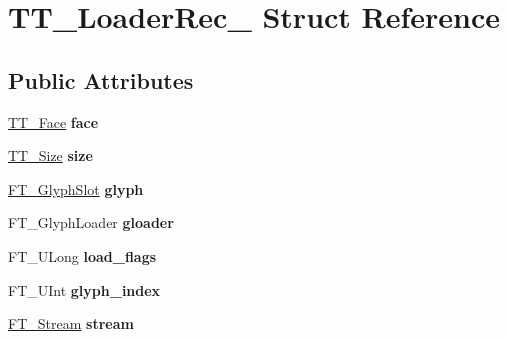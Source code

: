 \hypertarget{struct_t_t___loader_rec__}{}\section{T\+T\+\_\+\+Loader\+Rec\+\_\+ Struct Reference}
\label{struct_t_t___loader_rec__}
\subsection*{Public Attributes}
\begin{DoxyCompactItemize}
\item 
\mbox{\label{struct_t_t___loader_rec___abbccf35c9467ee5799e382ef5a70e36a}} 
\hyperlink{struct_t_t___face_rec__}{T\+T\+\_\+\+Face} {\bfseries face}
\item 
\mbox{\label{struct_t_t___loader_rec___a255a8fd4ceca32df819e320bb3f5b0c9}} 
\hyperlink{struct_t_t___size_rec__}{T\+T\+\_\+\+Size} {\bfseries size}
\item 
\mbox{\label{struct_t_t___loader_rec___a7843d7a665f8535faadf1bf1ec87b683}} 
\hyperlink{struct_f_t___glyph_slot_rec__}{F\+T\+\_\+\+Glyph\+Slot} {\bfseries glyph}
\item 
\mbox{\label{struct_t_t___loader_rec___a5c24ef5e731e4d9953be8ede99d6cf54}} 
F\+T\+\_\+\+Glyph\+Loader {\bfseries gloader}
\item 
\mbox{\label{struct_t_t___loader_rec___a19ca6de6b384c1b6143275a485a3160f}} 
F\+T\+\_\+\+U\+Long {\bfseries load\+\_\+flags}
\item 
\mbox{\label{struct_t_t___loader_rec___a5486105cac09d372c0971c237585b135}} 
F\+T\+\_\+\+U\+Int {\bfseries glyph\+\_\+index}
\item 
\mbox{\label{struct_t_t___loader_rec___abb44841d62cecea6dd413be951eae241}} 
\hyperlink{struct_f_t___stream_rec__}{F\+T\+\_\+\+Stream} {\bfseries stream}
\item 
\mbox{\label{struct_t_t___loader_rec___a43c6befa8051373b8d18e6a60c6bee30}} 

\end{DoxyCompactItemize}
